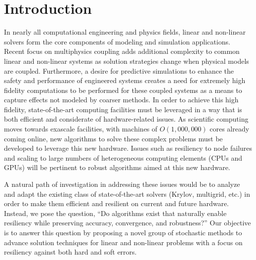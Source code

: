 
\section{Introduction}
\label{sec:introduction}

In nearly all computational engineering and physics fields, linear and
non-linear solvers form the core components of modeling and simulation
applications. Recent focus on multiphysics coupling adds additional complexity
to common linear and non-linear systems as solution strategies change when
physical models are coupled. Furthermore, a desire for predictive simulations
to enhance the safety and performance of engineered systems creates a need for
extremely high fidelity computations to be performed for these coupled systems
as a means to capture effects not modeled by coarser methods. In order to
achieve this high fidelity, state-of-the-art computing facilities must be
leveraged in a way that is both efficient and considerate of hardware-related
issues. As scientific computing moves towards exascale facilities, with
machines of $O(1,000,000)$ cores already coming online, new algorithms to
solve these complex problems must be developed to leverage this new
hardware. Issues such as resiliency to node failures and scaling to large
numbers of heterogeneous computing elements (CPUs and GPUs) will be pertinent
to robust algorithms aimed at this new hardware.

A natural path of investigation in addressing these issues would be to analyze
and adapt the existing class of state-of-the-art solvers (Krylov, multigrid,
etc.) in order to make them efficient and resilient on current and future
hardware.  Instead, we pose the question, ``Do algorithms exist that naturally
enable resiliency while preserving accuracy, convergence, and robustness?''
Our objective is to answer this question by proposing a novel group of
stochastic methods to advance solution techniques for linear and non-linear
problems with a focus on resiliency against both hard and soft errors.

